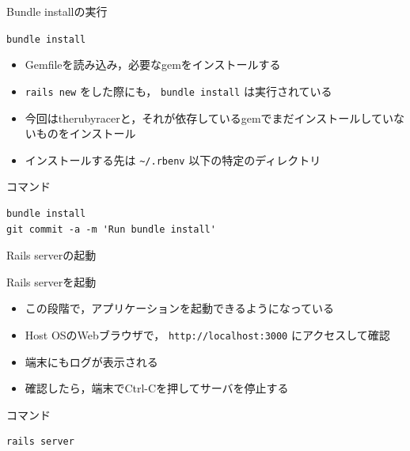 \documentclass[t, aspectratio=169]{beamer}
\begin{document}
\begin{frame}[fragile,label=sec-6-1-5]{Bundle installの実行}
 \begin{block}{\texttt{bundle install}}
\begin{itemize}
\item Gemfileを読み込み，必要なgemをインストールする
\item \texttt{rails new} をした際にも， \texttt{bundle install} は実行されている
\item 今回はtherubyracerと，それが依存しているgemでまだインストールしていないものをインストール
\item インストールする先は \texttt{\textasciitilde{}/.rbenv} 以下の特定のディレクトリ
\end{itemize}
\end{block}
\begin{block}{コマンド}
\begin{verbatim}
bundle install
git commit -a -m 'Run bundle install'
\end{verbatim}
\end{block}
\end{frame}

\begin{frame}[fragile,label=sec-6-1-6]{Rails serverの起動}
 \begin{block}{Rails serverを起動}
\begin{itemize}
\item この段階で，アプリケーションを起動できるようになっている
\item Host OSのWebブラウザで， \texttt{http://localhost:3000} にアクセスして確認
\item 端末にもログが表示される
\item 確認したら，端末でCtrl-Cを押してサーバを停止する
\end{itemize}
\end{block}
\begin{block}{コマンド}
\begin{verbatim}
rails server
\end{verbatim}
\end{block}
\end{frame}
\end{document}
